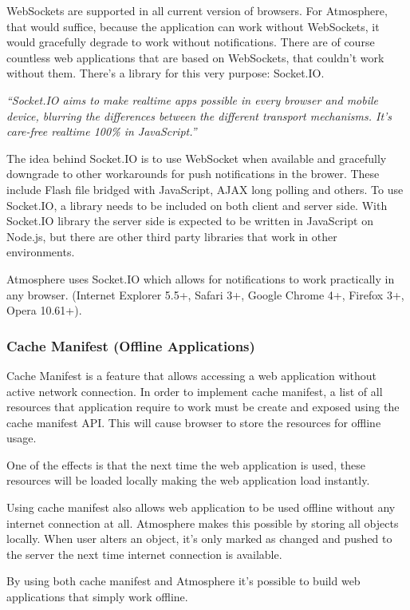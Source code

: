 WebSockets are supported in all current version of browsers. For Atmosphere, that would suffice, because the application can work without WebSockets, it would gracefully degrade to work without notifications. There are of course countless web applications that are based on WebSockets, that couldn’t work without them. There’s a library for this very purpose: Socket.IO. \citep{socketio}

\emph{``Socket.IO aims to make realtime apps possible in every browser and mobile device, blurring the differences between the different transport mechanisms. It's care-free realtime 100\% in JavaScript.''} \citep{socketio}

The idea behind Socket.IO is to use WebSocket when available and gracefully downgrade to other workarounds for push notifications in the brower. These include Flash file bridged with JavaScript, AJAX long polling and others. To use Socket.IO, a library needs to be included on both client and server side. With Socket.IO library the server side is expected to be written in JavaScript on Node.js, but there are other third party libraries that work in other environments.

Atmosphere uses Socket.IO which allows for notifications to work practically in any browser. (Internet Explorer 5.5+, Safari 3+, Google Chrome 4+, Firefox 3+, Opera 10.61+).

\subsubsection{Cache Manifest (Offline Applications)}

Cache Manifest is a feature that allows accessing a web application without active network connection. In order to implement cache manifest, a list of all resources that application require to work must be create and exposed using the cache manifest API. This will cause browser to store the resources for offline usage.

One of the effects is that the next time the web application is used, these resources will be loaded locally making the web application load instantly.

Using cache manifest also allows web application to be used offline without any internet connection at all. Atmosphere makes this possible by storing all objects locally. When user alters an object, it’s only marked as changed and pushed to the server the next time internet connection is available. 

By using both cache manifest and Atmosphere it’s possible to build web applications that simply work offline. 

